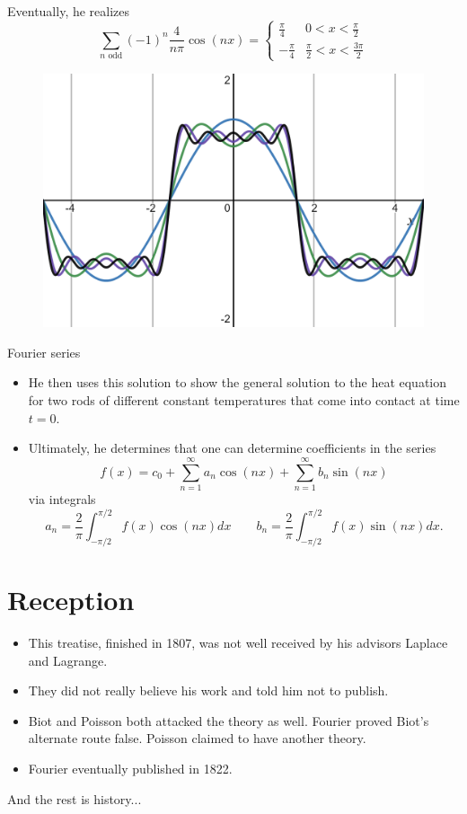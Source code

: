 \documentclass[aspectratio=169]{beamer}
\begin{document}
\begin{frame}{}
\vfill
Eventually, he realizes
\[
\sum_{n \textrm{ odd}} (-1)^n \frac{4}{n\pi} \cos(nx) = \begin{cases} \frac{\pi}{4} & 0<x<\frac{\pi}{2} \\
    -\frac{\pi}{4} & \frac{\pi}{2}<x<\frac{3\pi}{2}\end{cases}
\]
\begin{figure}[H]
    \centering
    \includegraphics[width=.6\textwidth]{figures/fourier_square.png}
\end{figure}
\vfill
\end{frame}

\begin{frame}{Fourier series}
\vfill
\begin{itemize}
    \pause
    \item He then uses this solution to show the general solution to the heat equation for two rods of different constant temperatures that come into contact at time $t=0$.
    \pause
    \item Ultimately, he determines that one can determine coefficients in the series
    \[
    f(x) = c_0 + \sum_{n=1}^\infty a_n \cos(nx) + \sum_{n=1}^\infty b_n \sin(nx)
    \]
 via integrals 
    \[
    a_n = \frac{2}{\pi}\int_{-\pi/2}^{\pi/2} f(x) \cos(nx)dx \qquad     b_n = \frac{2}{\pi}\int_{-\pi/2}^{\pi/2} f(x) \sin(nx)dx.
    \]
\end{itemize}
\vfill
\end{frame}

\section{Reception}

\begin{frame}{}
    \vfill
    \begin{itemize}
    \pause
    \item This treatise, finished in 1807, was not well received by his advisors Laplace and Lagrange.
    \pause
    \item They did not really believe his work and told him not to publish.
    \pause
    \item Biot and Poisson both attacked the theory as well. Fourier proved Biot's alternate route false. Poisson claimed to have another theory.
    \pause
    \item Fourier eventually published in 1822.
\end{itemize}
    \vfill
\end{frame}

\begin{frame}{}
\vfill
\begin{center} \Large{And the rest is history...} \end{center}
\vfill
\end{frame}
\end{document}
